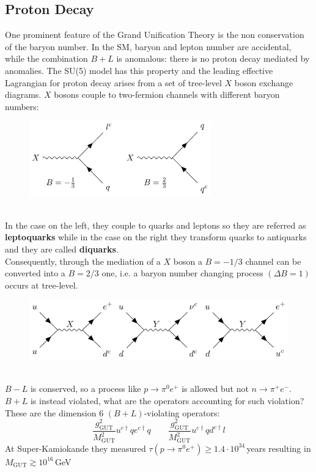 \documentclass[../main.tex]{subfiles}
\begin{document}
\subsection{Proton Decay}
One prominent feature of the Grand Unification Theory is the non conservation of the baryon number. In the SM, baryon and lepton number are accidental, while the combination $B+L$ is anomalous: there is no proton decay mediated by anomalies.  The SU(5) model has this property and the leading effective Lagrangian for proton decay arises from a set of tree-level $X$ boson exchange diagrams. $X$ bosons couple to two-fermion channels with different baryon numbers:\\
\begin{figure}[h]
    \centering
    \includegraphics[width=0.7\textwidth]{Images/baryonnumber.pdf}
    \caption*{}
\end{figure}\\
In the case on the left, they couple to quarks and leptons so they are referred as \textbf{leptoquarks} while in the case on the right they transform quarks to antiquarks and they are called \textbf{diquarks}.\\
Consequently, through the mediation of a $X$ boson a $B=-1/3$ channel can be converted into a $B=2/3$ one, i.e. a baryon number changing process $(\Delta B=1)$ occurs at tree-level.
\newpage
\begin{figure}[h]
    \centering
    \includegraphics{Images/xyy.pdf}
    \caption*{}
\end{figure}\\
$B-L$ is conserved, so a process like $p\to\pi^0e^+$ is allowed but not $n\to\pi^+e^-$. $B+L$ is instead violated, what are the operators accounting for such violation? These are the dimension 6 $(B+L)$-violating operators:
\[
\frac{g^2_{\text{GUT}}}{M^2_{\text{GUT}}}u^{c\dagger}qe^{c\dagger}q \qquad \frac{g^2_{\text{GUT}}}{M^2_{\text{GUT}}}u^{c\dagger}qd^{c\dagger}l 
\]
At Super-Kamiokande they measured $\tau(p\to\pi^0e^+)\ge1.4\cdot10^{34}$\,years resulting in $M_{\text{GUT}}\gtrsim10^{16}$\,GeV
\end{document}
